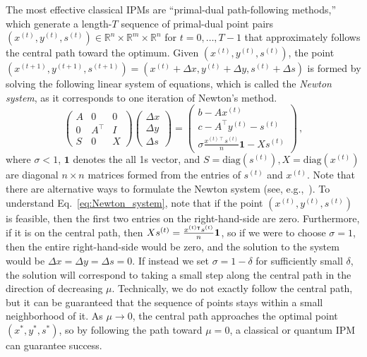 \begin{refsection}
The most effective classical IPMs are ``primal-dual path-following methods,'' which generate a length-$T$ sequence of primal-dual point pairs $(x^{(t)},y^{(t)},s^{(t)}) \in \mathbb{R}^n \times \mathbb{R}^m \times \mathbb{R}^n$ for $t=0,\ldots,T-1$ that approximately follows the central path toward the optimum. Given  $(x^{(t)},y^{(t)},s^{(t)})$, the point $(x^{(t+1)},y^{(t+1)},s^{(t+1)}) = (x^{(t)}+\Delta x,y^{(t)} + \Delta y,s^{(t)} + \Delta s)$ is formed by solving the following linear system of equations, which is called the \emph{Newton system}, as it corresponds to one iteration of Newton's method. 
\begin{equation}\label{eq:Newton_system}
    \begin{pmatrix}
    A & 0 & 0 \\
    0 & A^\intercal & I \\
    S & 0 & X
    \end{pmatrix}
    \begin{pmatrix}
    \Delta x \\
    \Delta y \\
    \Delta s
    \end{pmatrix}
    = 
    \begin{pmatrix}
    b-Ax^{(t)} \\
    c-A^\intercal y^{(t)} - s^{(t)} \\
    \sigma \frac{x^{(t)\intercal} s^{(t)}}{n}\mathbf{1} - Xs^{(t)}
    \end{pmatrix}\,,
\end{equation}
where $\sigma<1$, $\mathbf{1}$ denotes the all 1s vector, and $S = \text{diag}(s^{(t)}), X = \text{diag}(x^{(t)})$ are diagonal $n \times n$ matrices formed from the entries of $s^{(t)}$ and $x^{(t)}$. Note that there are alternative ways to formulate the Newton system (see, e.g.,~\cite{augustino2021quantum,augustino2022inexact}). To understand Eq.~\eqref{eq:Newton_system}, note that if the point $(x^{(t)}, y^{(t)}, s^{(t)})$ is feasible, then the first two entries on the right-hand-side are zero. Furthermore, if it is on the central path, then $Xs^{(t)} = \frac{x^{(t)\intercal} s^{(t)}}{n} \mathbf{1}$, so if we were to choose $\sigma=1$, then the entire right-hand-side would be zero, and the solution to the system would be $\Delta x = \Delta y = \Delta s = 0$. If instead we set $\sigma = 1-\delta$ for sufficiently small $\delta$, the solution will correspond to taking a small step along the central path in the direction of decreasing $\mu$. Technically, we do not exactly follow the central path, but it can be guaranteed that the sequence of points stays within a small neighborhood of it.  As $\mu \rightarrow 0$, the central path approaches the optimal point $(x^*,y^*,s^*)$, so by following the path toward $\mu = 0$, a classical or quantum IPM can guarantee success. 


\end{refsection}
